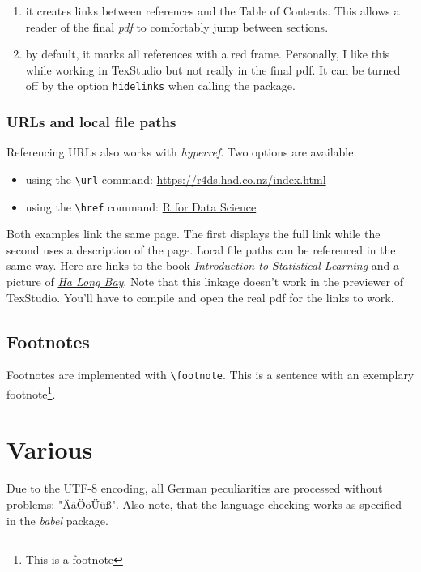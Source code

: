 \documentclass[a4paper]{scrartcl}
\begin{document}
	\begin{enumerate}
		\item it creates links between references and the Table of Contents. This allows a reader of the final \emph{pdf} to comfortably jump between sections.
		\item by default, it marks all references with a red frame. Personally, I like this while working in TexStudio but not really in the final pdf. It can be turned off by the option \texttt{hidelinks} when calling the package.
	\end{enumerate}



	\subsubsection{URLs and local file paths}
	
	Referencing URLs also works with \emph{hyperref}. Two options are available:
	\begin{itemize}
		\item using the \texttt{\textbackslash url} command: \url{https://r4ds.had.co.nz/index.html} 
		\item using the \texttt{\textbackslash href} command:
		\href{https://r4ds.had.co.nz/index.html}{R for Data Science}
	\end{itemize}
Both examples link the same page. The first displays the full link while the second uses a description of the page. Local file paths can be referenced in the same way. Here are links to the book
\href{run:C:/Users/psymo/OneDrive/Studium/Statistik/Dokumente/ISL/An Introduction to Statistical Learning.pdf}{\emph{Introduction to Statistical Learning}} and a picture of \href{run:C:/Users/psymo/Pictures/Korea/Korea/20190630_154735_HDR.jpg}{\emph{Ha Long Bay}}. Note that this linkage doesn't work in the previewer of TexStudio. You'll have to compile and open the real pdf for the links to work.

\subsection{Footnotes}
Footnotes are implemented with \texttt{\textbackslash footnote}. This is a sentence with an exemplary footnote\footnote{This is a footnote}.

	\section{Various}
	Due to the UTF-8 encoding, all German peculiarities are processed without problems: "ÄäÖöÜüß". Also note, that the language checking works as specified in the \emph{babel} package.
	
\end{document}
